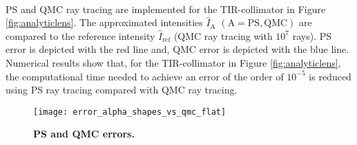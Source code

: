 \\ \indent PS and QMC ray tracing are implemented for the TIR-collimator in Figure \ref{fig:analyticlens}. The approximated intensities $\hat{I}_{\textrm{A}}$ $(\textrm{A} = \textrm{PS}, \textrm{QMC})$ are compared to the reference intensity $\hat{I}_{\textrm{ref}}$ (QMC ray tracing with $10^7$ rays).
PS error is depicted with the red line and, QMC error is depicted with the blue line. \\ \indent
Numerical results show that, for the TIR-collimator in Figure \ref{fig:analyticlens}, the computational time needed to achieve an error of the order of $10^{-5}$ is reduced using PS ray tracing compared with QMC ray tracing.
\begin{figure}[t]
 \begin{center}
   \texttt{[image: error\_alpha\_shapes\_vs\_qmc\_flat]}
    \end{center}
     \caption{\textbf{PS and QMC errors.}}
 \label{fig:error2}
\end{figure}
